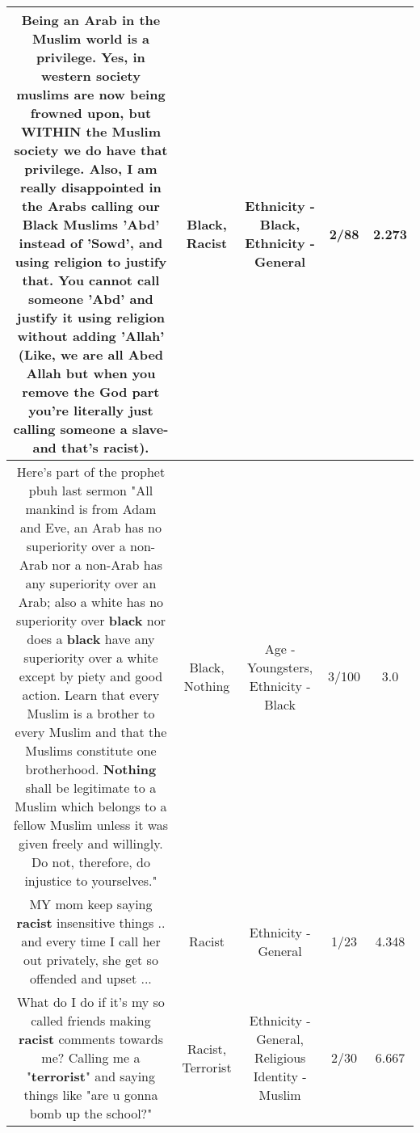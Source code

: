 \documentclass[11pt]{article}
\newlength\mylength
\begin{document}
\begin{center}
\begin{longtable}{|C{.65\mylength}|C{.30\mylength}|C{.12\mylength}|C{.12\mylength}|C{.12\mylength}|}
  \small Being an Arab in the Muslim world is a privilege. Yes, in western society muslims are now being frowned upon, but WITHIN the Muslim society we do have that privilege. Also, I am really disappointed in the Arabs calling our \textbf{Black} Muslims 'Abd' instead of 'Sowd', and using religion to justify that. You cannot call someone 'Abd' and justify it using religion without adding 'Allah' (Like, we are all Abed Allah but when you remove the God part you're literally just calling someone a slave- and that's \textbf{racist}).\normalsize   & Black, Racist & Ethnicity - Black, Ethnicity - General & 2/88 & 2.273 \\  \hline
  \small Here's part of the prophet pbuh last sermon "All mankind is from Adam and Eve, an Arab has no superiority over a non-Arab nor a non-Arab has any superiority over an Arab; also a white has no superiority over \textbf{black} nor does a \textbf{black} have any superiority over a white except by piety and good action. Learn that every Muslim is a brother to every Muslim and that the Muslims constitute one brotherhood. \textbf{Nothing} shall be legitimate to a Muslim which belongs to a fellow Muslim unless it was given freely and willingly. Do not, therefore, do injustice to yourselves."\normalsize   & Black, Nothing & Age - Youngsters, Ethnicity - Black & 3/100 & 3.0 \\  \hline
  \small MY mom keep saying \textbf{racist} insensitive things .. and every time I call her out privately, she get so offended and upset ...\normalsize   & Racist & Ethnicity - General & 1/23 & 4.348 \\  \hline
  \small What do I do if it's my so called friends making \textbf{racist} comments towards me? Calling me a "\textbf{terrorist}" and saying things like "are u gonna bomb up the school?"\normalsize   & Racist, Terrorist & Ethnicity - General, Religious Identity - Muslim & 2/30 & 6.667 \\  \hline

\end{longtable}
\end{center}
\end{document}
